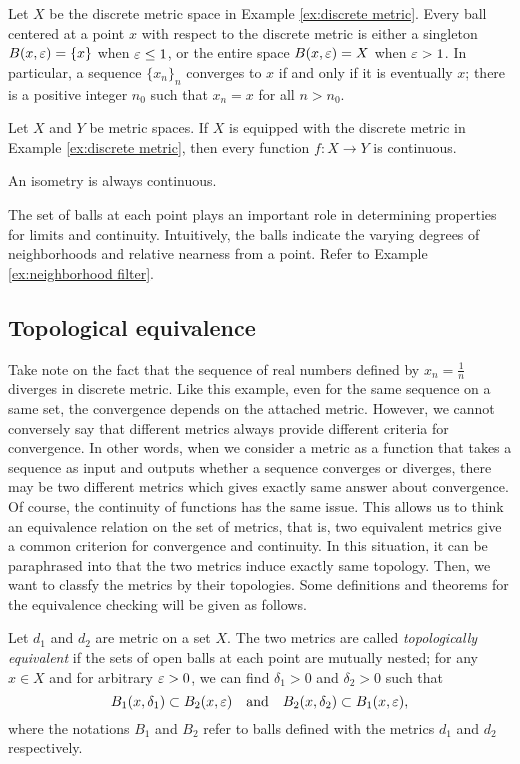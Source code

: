 \documentclass{../crs}
\begin{document}
\begin{ex}
Let $X$ be the discrete metric space in Example \ref{ex:discrete metric}.
Every ball centered at a point $x$ with respect to the discrete metric is either a singleton $B(x,\varepsilon)=\{x\}$ when $\varepsilon\le1$, or the entire space $B(x,\varepsilon)=X$ when $\varepsilon>1$.
In particular, a sequence $\{x_n\}_n$ converges to $x$ if and only if it is eventually $x$; there is a positive integer $n_0$ such that $x_n=x$ for all $n>n_0$.
\end{ex}
\begin{ex}
Let $X$ and $Y$ be metric spaces.
If $X$ is equipped with the discrete metric in Example \ref{ex:discrete metric}, then every function $f:X\to Y$ is continuous.
\end{ex}
\begin{ex}
An isometry is always continuous.
\end{ex}

The set of balls at each point plays an important role in determining properties for limits and continuity.
Intuitively, the balls indicate the varying degrees of neighborhoods and relative nearness from a point.
Refer to Example \ref{ex:neighborhood filter}.



\subsection{Topological equivalence}
Take note on the fact that the sequence of real numbers defined by $x_n=\frac1n$ diverges in discrete metric.
Like this example, even for the same sequence on a same set, the convergence depends on the attached metric.
However, we cannot conversely say that different metrics always provide different criteria for convergence.
In other words, when we consider a metric as a function that takes a sequence as input and outputs whether a sequence converges or diverges, there may be two different metrics which gives exactly same answer about convergence.
Of course, the continuity of functions has the same issue.
This allows us to think an equivalence relation on the set of metrics, that is, two equivalent metrics give a common criterion for convergence and continuity.
In this situation, it can be paraphrased into that the two metrics induce exactly same topology.
Then, we want to classfy the metrics by their topologies.
Some definitions and theorems for the equivalence checking will be given as follows.

\begin{defn}
Let $d_1$ and $d_2$ are metric on a set $X$.
The two metrics are called \emph{topologically equivalent} if the sets of open balls at each point are mutually nested;
for any $x\in X$ and for arbitrary $\varepsilon>0$, we can find $\delta_1>0$ and $\delta_2>0$ such that
\[B_1(x,\delta_1)\subset B_2(x,\varepsilon)\quad\text{and}\quad B_2(x,\delta_2)\subset B_1(x,\varepsilon),\]
where the notations $B_1$ and $B_2$ refer to balls defined with the metrics $d_1$ and $d_2$ respectively.
\end{defn}
\end{document}
